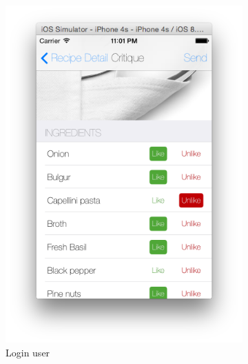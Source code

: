 \begin{figure}[h]
\begin{subfigure}{.32\textwidth}
	  		\includegraphics[width=.9\linewidth]{figures/ch4_app_screen_shots/critique/critique_2.png}
	  		\caption{Login user}
	  	\end{subfigure}
	  	\begin{subfigure}{.32\textwidth}

\end{subfigure}
\end{figure}
